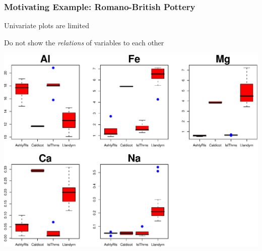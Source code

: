 \begin{frame}
	\frametitle{Motivating Example: Romano-British Pottery}
  \begin{block}{Univariate plots are limited}
  	\begin{itemize*}
  	\item Do not show the \emph{relations} of variables to each other
    \end{itemize*}
  \end{block}
 	\begin{center}
 	\includegraphics[width=.6\textwidth,clip]{fig/pottery-box}
 	\end{center}
	
\end{frame}

